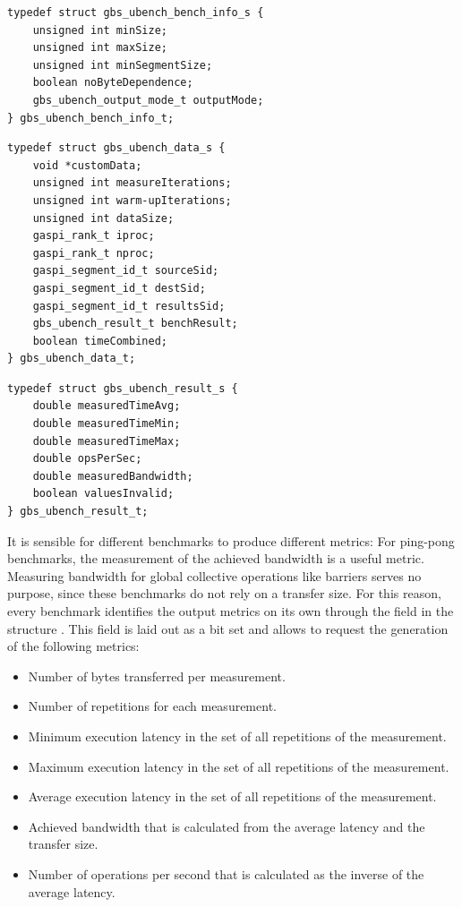 \begin{lstlisting}[style=cpp,captionpos={b},caption={Definition of the structure \code{gbs\_ubench\_bench\_info\_t}.},label=lst:impl:gbs-benchmark-ubench-info]
typedef struct gbs_ubench_bench_info_s {
	unsigned int minSize;
	unsigned int maxSize;
	unsigned int minSegmentSize;
	boolean noByteDependence;
	gbs_ubench_output_mode_t outputMode;
} gbs_ubench_bench_info_t;
\end{lstlisting}

\begin{lstlisting}[style=cpp,captionpos={b},caption={Definition of the structure \code{gbs\_ubench\_data\_t}.},label=lst:impl:gbs-benchmark-ubench-data]
typedef struct gbs_ubench_data_s {
	void *customData;
	unsigned int measureIterations;
	unsigned int warm-upIterations;
	unsigned int dataSize;
	gaspi_rank_t iproc;
	gaspi_rank_t nproc;
	gaspi_segment_id_t sourceSid;
	gaspi_segment_id_t destSid;
	gaspi_segment_id_t resultsSid;
	gbs_ubench_result_t benchResult;
	boolean timeCombined;
} gbs_ubench_data_t;
\end{lstlisting}


\begin{lstlisting}[style=cpp,captionpos={b},caption={Definition of the structure \code{gbs\_ubench\_result\_t}.},label=lst:impl:gbs-benchmark-ubench-result]
typedef struct gbs_ubench_result_s {
	double measuredTimeAvg;
	double measuredTimeMin;
	double measuredTimeMax;
	double opsPerSec;
	double measuredBandwidth;
	boolean valuesInvalid;
} gbs_ubench_result_t;
\end{lstlisting}

It is sensible for different benchmarks to produce different metrics: For \eg ping-pong benchmarks, the measurement of the achieved bandwidth is a useful metric. Measuring bandwidth for global collective operations like barriers serves no purpose, since these benchmarks do not rely on a transfer size. For this reason, every benchmark identifies the output metrics on its own through the  field in the structure \ubenchInfo. This field is laid out as a bit set and allows to request the generation of the following metrics:
\begin{itemize}
	\item Number of bytes transferred per measurement.
	\item Number of repetitions for each measurement.
	\item Minimum execution latency in the set of all repetitions of the measurement.
	\item Maximum execution latency in the set of all repetitions of the measurement.
	\item Average execution latency in the set of all repetitions of the measurement.
	\item Achieved bandwidth that is calculated from the average latency and the transfer size.
	\item Number of operations per second that is calculated as the inverse of the average latency.
\end{itemize}


